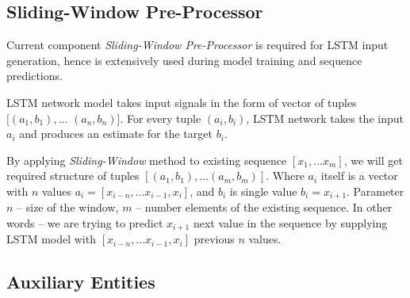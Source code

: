 \subsection{Sliding-Window Pre-Processor}

Current component \textit{Sliding-Window Pre-Processor} is required for LSTM input generation, hence is extensively used during model training and sequence predictions.

LSTM network model takes input signals in the form of vector of tuples $[(a_1, b_1), ...$ $(a_n, b_n)]$. For every tuple $(a_i, b_i)$, LSTM network takes the input $a_i$ and produces an estimate for the target $b_i$. 

By applying \textit{Sliding-Window} method to existing sequence $[x_1, ...x_m]$, we will get required structure of tuples $[(a_1, b_1), ...(a_m, b_m)]$. Where $a_i$ itself is a vector with $n$ values $a_i = [x_{i-n}, ...x_{i-1}, x_i]$, and $b_i$ is single value $b_i = x_{i+1}$. Parameter $n$ -- size of the window, $m$ -- number elements of the existing sequence. In other words -- we are trying to predict $x_{i+1}$ next value in the sequence by supplying LSTM model with $[x_{i-n}, ...x_{i-1}, x_i]$ previous $n$ values.

\subsection{Auxiliary Entities}

